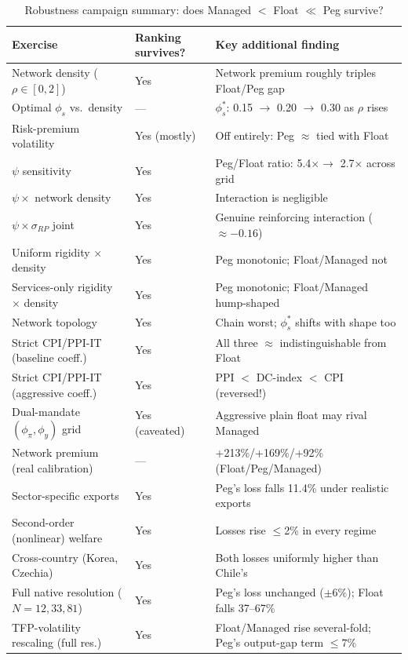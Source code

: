 \documentclass[12pt]{article}
\begin{document}
\begin{table}[H]
\centering
\small
\caption{Robustness campaign summary: does Managed $<$ Float $\ll$ Peg survive?}
\label{tab:robustness_summary}
\begin{tabular}{p{4.3cm}lp{6.3cm}}
\toprule
Exercise & Ranking survives? & Key additional finding \\
\midrule
Network density ($\rho\in[0,2]$) & Yes & Network premium roughly triples Float/Peg gap \\
Optimal $\phi_s$ vs.\ density & --- & $\phi_s^*$: 0.15 $\to$ 0.20 $\to$ 0.30 as $\rho$ rises \\
Risk-premium volatility & Yes (mostly) & Off entirely: Peg $\approx$ tied with Float \\
$\psi$ sensitivity & Yes & Peg/Float ratio: 5.4$\times \to$ 2.7$\times$ across grid \\
$\psi\times$ network density & Yes & Interaction is negligible \\
$\psi\times\sigma_{RP}$ joint & Yes & Genuine reinforcing interaction ($\approx-0.16$) \\
Uniform rigidity $\times$ density & Yes & Peg monotonic; Float/Managed not \\
Services-only rigidity $\times$ density & Yes & Peg monotonic; Float/Managed hump-shaped \\
Network topology & Yes & Chain worst; $\phi_s^*$ shifts with shape too \\
Strict CPI/PPI-IT (baseline coeff.) & Yes & All three $\approx$ indistinguishable from Float \\
Strict CPI/PPI-IT (aggressive coeff.) & Yes & PPI $<$ DC-index $<$ CPI (reversed!) \\
Dual-mandate $(\phi_\pi,\phi_y)$ grid & Yes (caveated) & Aggressive plain float may rival Managed \\
Network premium (real calibration) & --- & +213\%/+169\%/+92\% (Float/Peg/Managed) \\
Sector-specific exports & Yes & Peg's loss falls 11.4\% under realistic exports \\
Second-order (nonlinear) welfare & Yes & Losses rise $\le$2\% in every regime \\
Cross-country (Korea, Czechia) & Yes & Both losses uniformly higher than Chile's \\
Full native resolution ($N=12,33,81$) & Yes & Peg's loss unchanged ($\pm6\%$); Float falls 37--67\% \\
TFP-volatility rescaling (full res.) & Yes & Float/Managed rise several-fold; Peg's output-gap term $\le7\%$ \\
\bottomrule
\end{tabular}
\end{table}
\end{document}
